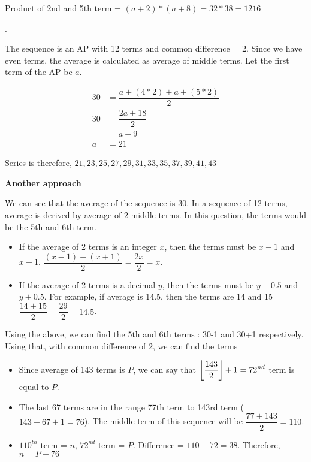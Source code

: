 Product of 2nd and 5th term = $(a + 2) * (a + 8) = 32 * 38 = 1216$

. 

The sequence is an AP with 12 terms and common difference = 2. Since we have even terms, the average is calculated as average of middle terms. Let the first term of the AP be $a$.

\begin{align*}
    30 &= \dfrac{a + (4 * 2) + a + (5 * 2)}{2} \\
    30 &= \dfrac{2a + 18}{2} \\
    &= a + 9 \\
    a &= 21
\end{align*}

Series is therefore, $21,23,25,27,29,31,33,35,37,39,41,43$

\textbf{Another approach}

We can see that the average of the sequence is 30. In a sequence of 12 terms, average is derived by average of 2 middle terms. In this question, the terms would be the 5th and 6th term. 

\begin{itemize}
    \item If the average of 2 terms is an integer $x$, then the terms must be $x-1$ and $x+1$. $\dfrac{(x-1) + (x+1)}{2} = \dfrac{2x}{2} = x$. 

    \item If the average of 2 terms is a decimal $y$, then the terms must be $y-0.5$ and $y+0.5$. For example, if average is 14.5, then the terms are 14 and 15 $\dfrac{14 + 15}{2} = \dfrac{29}{2} = 14.5$. 
\end{itemize}

Using the above, we can find the 5th and 6th terms : 30-1 and 30+1 respectively. Using that, with common difference of 2, we can find the terms


\begin{itemize}
    \item Since average of 143 terms is $P$, we can say that $\displaystyle{\left \lfloor {\dfrac{143}{2}} \right \rfloor} + 1 = 72^{nd}$ term is equal to $P$. 
    
    \item The last 67 terms are in the range 77th term to 143rd term ($143 - 67 + 1 = 76$). The middle term of this sequence will be $\dfrac{77 + 143}{2} = 110$. 
    
    \item $110^{th}$ term = $n$, $72^{nd}$ term = $P$. Difference = $110 - 72 = 38$. Therefore, $n = P + 76$
\end{itemize}

